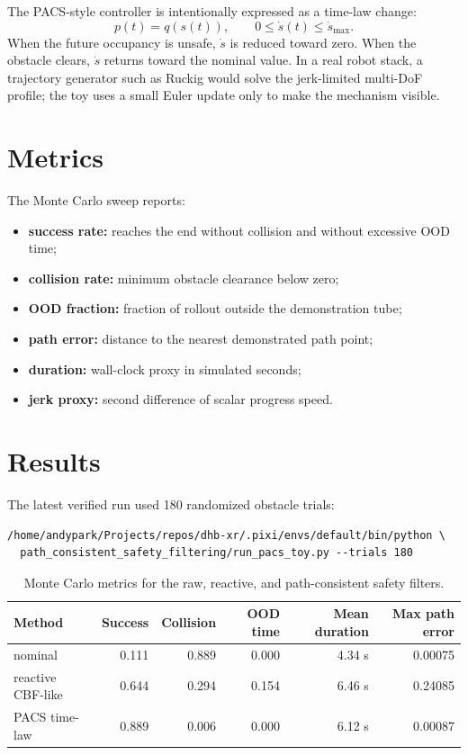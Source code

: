 \documentclass[11pt]{article}
\begin{document}
The PACS-style controller is intentionally expressed as a time-law change:
\[
  p(t) = q(s(t)), \qquad 0 \leq \dot{s}(t) \leq \dot{s}_{\max}.
\]
When the future occupancy is unsafe, \(\dot{s}\) is reduced toward zero. When the obstacle clears, \(\dot{s}\) returns toward the nominal value. In a real robot stack, a trajectory generator such as Ruckig would solve the jerk-limited multi-DoF profile; the toy uses a small Euler update only to make the mechanism visible.

\section{Metrics}

The Monte Carlo sweep reports:
\begin{itemize}[leftmargin=1.5em]
  \item \textbf{success rate:} reaches the end without collision and without excessive OOD time;
  \item \textbf{collision rate:} minimum obstacle clearance below zero;
  \item \textbf{OOD fraction:} fraction of rollout outside the demonstration tube;
  \item \textbf{path error:} distance to the nearest demonstrated path point;
  \item \textbf{duration:} wall-clock proxy in simulated seconds;
  \item \textbf{jerk proxy:} second difference of scalar progress speed.
\end{itemize}

\section{Results}

The latest verified run used 180 randomized obstacle trials:
\begin{verbatim}
/home/andypark/Projects/repos/dhb-xr/.pixi/envs/default/bin/python \
  path_consistent_safety_filtering/run_pacs_toy.py --trials 180
\end{verbatim}

\begin{table}[H]
\centering
\begin{tabular}{lrrrrr}
\toprule
Method & Success & Collision & OOD time & Mean duration & Max path error \\
\midrule
nominal & 0.111 & 0.889 & 0.000 & 4.34 s & 0.00075 \\
reactive CBF-like & 0.644 & 0.294 & 0.154 & 6.46 s & 0.24085 \\
PACS time-law & 0.889 & 0.006 & 0.000 & 6.12 s & 0.00087 \\
\bottomrule
\end{tabular}
\caption{Monte Carlo metrics for the raw, reactive, and path-consistent safety filters.}
\end{table}
\end{document}
